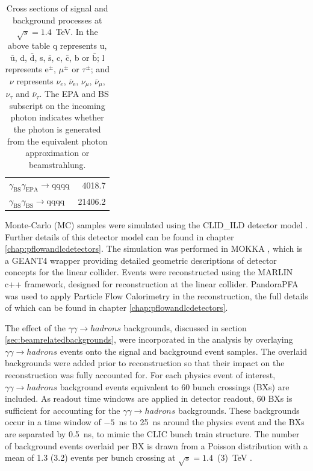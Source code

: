 \begin{table}[h!]
\begin{tabular}{ l r }
$\gamma_{\text{BS}}\gamma_{\text{EPA}} \rightarrow \text{qqqq}$ & 4018.7\\
$\gamma_{\text{BS}}\gamma_{\text{BS}} \rightarrow \text{qqqq}$ & 21406.2\\
\hline
\end{tabular}
\caption[Cross sections of signal and background processes at $\sqrt{s}=1.4$~TeV]{Cross sections of signal and background processes at $\sqrt{s}=1.4$~TeV.  In the above table q represents u, $\bar{\text{u}}$, d, $\bar{\text{d}}$, s, $\bar{\text{s}}$, c, $\bar{\text{c}}$, b or $\bar{\text{b}}$;  l represents $\text{e}^{\pm}$, $\mu^{\pm}$ or $\tau^{\pm}$; and $\nu$ represents $\nu_{e}$, $\overline{\nu}_{\text{e}}$, $\nu_{\mu}$, $\overline{\nu}_{\mu}$, $\nu_{\tau}$ and $\overline{\nu}_{\tau}$.  The EPA and BS subscript on the incoming photon indicates whether the photon is generated from the equivalent photon approximation or beamstrahlung.}
\label{table:crosssection1400GeV}
\end{table}

Monte-Carlo (MC) samples were simulated using the CLID\_ILD detector model \cite{arXiv:1006.3396}.  Further details of this detector model can be found in chapter \ref{chap:pflowandlcdetectors}.  The simulation was performed in MOKKA \cite{MoradeFreitas:2002kj}, which is a GEANT4 \cite{Agostinelli:2002hh} wrapper providing detailed geometric descriptions of detector concepts for the linear collider.  Events were reconstructed using the MARLIN \cite{Gaede:2006pj} c++ framework, designed for reconstruction at the linear collider.  PandoraPFA \cite{arXiv:0907.3577, arXiv:1209.4039} was used to apply Particle Flow Calorimetry in the reconstruction, the full details of which can be found in chapter \ref{chap:pflowandlcdetectors}.
  
The effect of the $\gamma\gamma \rightarrow hadrons$ backgrounds, discussed in section \ref{sec:beamrelatedbackgrounds}, were incorporated in the analysis by overlaying $\gamma\gamma \rightarrow hadrons$ events onto the signal and background event samples.  The overlaid backgrounds were added prior to reconstruction so that their impact on the reconstruction was fully accounted for.  For each physics event of interest, $\gamma\gamma \rightarrow hadrons$ background events equivalent to 60 bunch crossings (BXs) are included.  As readout time windows are applied in detector readout, 60 BXs is sufficient for accounting for the $\gamma\gamma \rightarrow hadrons$ backgrounds.  These backgrounds occur in a time window of $-5$~ns to 25~ns around the physics event and the BXs are separated by 0.5~ns, to mimic the CLIC bunch train structure.  The number of background events overlaid per BX is drawn from a Poisson distribution with a mean of 1.3 (3.2) events per bunch crossing at $\sqrt{s}=1.4$~(3)~TeV \cite{Linssen:2012hp}.  

